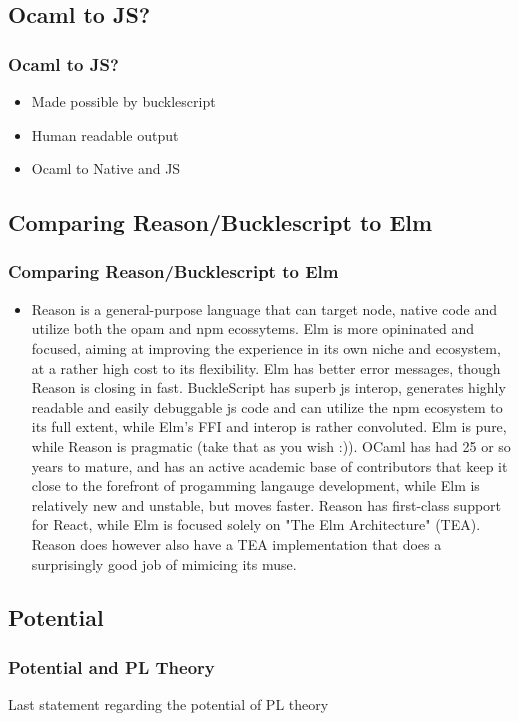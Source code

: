 \documentclass{beamer}
\begin{document}
\begin{frame}
  \section{Ocaml to JS?}
  \frametitle{Ocaml to JS?}
  \pause
  \begin{itemize}
  \item Made possible by bucklescript
    \pause
  \item Human readable output
    \pause
  \item Ocaml to Native and JS
  \end{itemize}
\end{frame}

\begin{frame}
  \section{Comparing Reason/Bucklescript to Elm}
  \frametitle{Comparing Reason/Bucklescript to Elm}
  \pause
  \begin{itemize}
  \item Reason is a general-purpose language that can target node, native code and utilize both the opam and npm ecossytems. Elm is more opininated and focused, aiming at improving the experience in its own niche and ecosystem, at a rather high cost to its flexibility. Elm has better error messages, though Reason is closing in fast. BuckleScript has superb js interop, generates highly readable and easily debuggable js code and can utilize the npm ecosystem to its full extent, while Elm's FFI and interop is rather convoluted. Elm is pure, while Reason is pragmatic (take that as you wish :)). OCaml has had 25 or so years to mature, and has an active academic base of contributors that keep it close to the forefront of progamming langauge development, while Elm is relatively new and unstable, but moves faster. Reason has first-class support for React, while Elm is focused solely on "The Elm Architecture" (TEA). Reason does however also have a TEA implementation that does a surprisingly good job of mimicing its muse.
    \pause
  \end{itemize}
\end{frame}


\begin{frame}
  \section{Potential}
    \frametitle{Potential and PL Theory}
    Last statement regarding the potential of PL theory
\end{frame}
\end{document}
